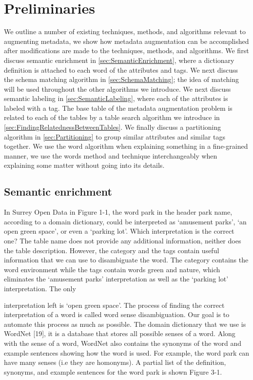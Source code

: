 
\chapter{Preliminaries}
\label{ch:Preliminaries}

We outline a number of existing techniques, methods, and algorithms relevant to augmenting metadata, we show how metadata augmentation can be accomplished after modifications are made to the techniques, methods, and algorithms. We first discuss semantic enrichment in \autoref{sec:SemanticEnrichment}, where a dictionary definition is attached to each word of the attributes and tags. We next discuss the schema matching algorithm in \autoref{sec:SchemaMatching}; the idea of matching will be used throughout the other algorithms we introduce. We next discuss semantic labeling in \autoref{sec:SemanticLabeling}, where each of the attributes is labeled with a tag. The base table of the metadata augmentation problem is related to each of the tables by a table search algorithm we introduce in \autoref{sec:FindingRelatednessBetweenTables}. We finally discuss a partitioning algorithm in \autoref{sec:Partitioning} to group similar attributes and similar tags together. We use the word algorithm when explaining something in a fine-grained manner, we use the words method and technique interchangeably when explaining some matter without going into its details.

\section{Semantic enrichment}
\label{sec:SemanticEnrichment}

In Surrey Open Data in Figure 1-1, the word park in the header park name, according to a domain dictionary, could be interpreted as `amusement parks', `an open green space', or even a `parking lot'. Which interpretation is the correct one? The table name does not provide any additional information, neither does the table description. However, the category and the tags contain useful information that we can use to disambiguate the word. The category contains the word environment while the tags contain words green and nature, which eliminates the `amusement parks' interpretation as well as the `parking lot' interpretation. The only

interpretation left is `open green space'. The process of finding the correct interpretation of a word is called word sense disambiguation. Our goal is to automate this process as much as possible.
The domain dictionary that we use is WordNet \cite{Fellbaum1998Computers}[19], it is a database that stores all possible senses of a word. Along with the sense of a word, WordNet also contains the synonyms of the word and example sentences showing how the word is used. For example, the word park can have many senses (i.e they are homonyms). A partial list of the definition, synonyms, and example sentences for the word park is shown Figure 3-1.

